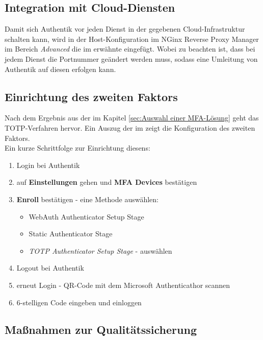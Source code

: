 \subsection{Integration mit Cloud-Diensten}
\label{sec:Integration mit Cloud-Diensten}
Damit sich Authentik vor jeden Dienst in der gegebenen Cloud-Infrastruktur schalten kann, wird in der Host-Konfiguration im NGinx Reverse 
Proxy Manager im Bereich \textit{Advanced} die im  erwähnte  eingefügt. Wobei zu beachten ist, 
dass bei jedem Dienst die Portnummer geändert werden muss, sodass eine Umleitung von Authentik auf diesen erfolgen kann.

\subsection{Einrichtung des zweiten Faktors}
\label{sec:Einrichtung des zweiten Faktors}
Nach dem Ergebnis aus der  im Kapitel \ref{sec:Auswahl einer MFA-Lösung}  
geht das \acs{TOTP}-Verfahren hervor. Ein Auszug der  im  zeigt die Konfiguration des 
zweiten Faktors.
\\Ein kurze Schrittfolge zur Einrichtung diesens:
\begin{enumerate}
    \item Login bei Authentik
    \item auf \textbf{Einstellungen} gehen und \textbf{\acs{MFA} Devices} bestätigen
    \item \textbf{Enroll} bestätigen - eine Methode auswählen:
    \begin{itemize}
        \item WebAuth Authenticator Setup Stage
        \item Static Authenticator Stage
        \item \textit{TOTP Authenticator Setup Stage} - auswählen
    \end{itemize}
   \item Logout bei Authentik
   \item erneut Login - QR-Code mit dem Microsoft Authenticathor scannen
   \item 6-stelligen Code eingeben und einloggen
\end{enumerate}

\subsection{Maßnahmen zur Qualitätssicherung}
\label{sec:Qualitaetssicherung}


